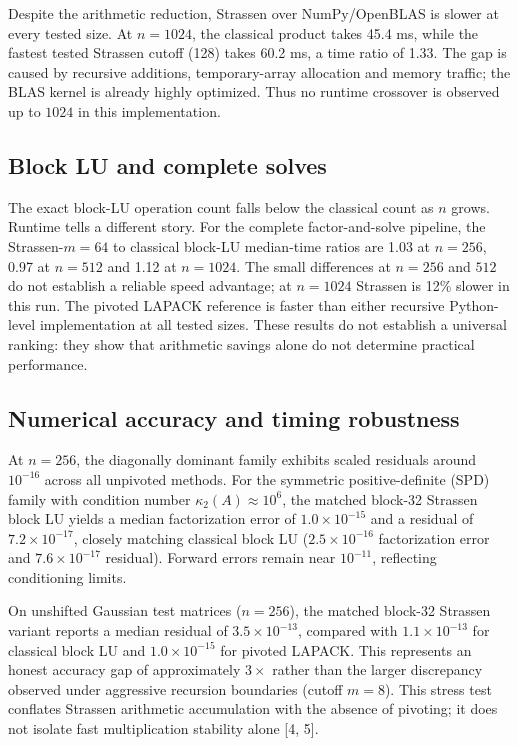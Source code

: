 \documentclass[9pt,a4paper]{article}
\begin{document}
Despite the arithmetic reduction, Strassen over NumPy/OpenBLAS is slower at every tested size. At $n=1024$, the classical product takes 45.4 ms, while the fastest tested Strassen cutoff (128) takes 60.2 ms, a time ratio of 1.33. The gap is caused by recursive additions, temporary-array allocation and memory traffic; the BLAS kernel is already highly optimized. Thus no runtime crossover is observed up to $1024$ in this implementation.

\subsection{Block LU and complete solves}
The exact block-LU operation count falls below the classical count as $n$ grows. Runtime tells a different story. For the complete factor-and-solve pipeline, the Strassen-$m=64$ to classical block-LU median-time ratios are 1.03 at $n=256$, 0.97 at $n=512$ and 1.12 at $n=1024$. The small differences at $n=256$ and $512$ do not establish a reliable speed advantage; at $n=1024$ Strassen is 12\% slower in this run. The pivoted LAPACK reference is faster than either recursive Python-level implementation at all tested sizes. These results do not establish a universal ranking: they show that arithmetic savings alone do not determine practical performance.

\newpage
\subsection{Numerical accuracy and timing robustness}
At $n=256$, the diagonally dominant family exhibits scaled residuals around $10^{-16}$ across all unpivoted methods. For the symmetric positive-definite (SPD) family with condition number $\kappa_2(A) \approx 10^{6}$, the matched block-32 Strassen block LU yields a median factorization error of $1.0 \times 10^{-15}$ and a residual of $7.2 \times 10^{-17}$, closely matching classical block LU ($2.5 \times 10^{-16}$ factorization error and $7.6 \times 10^{-17}$ residual). Forward errors remain near $10^{-11}$, reflecting conditioning limits. 

On unshifted Gaussian test matrices ($n=256$), the matched block-32 Strassen variant reports a median residual of $3.5 \times 10^{-13}$, compared with $1.1 \times 10^{-13}$ for classical block LU and $1.0 \times 10^{-15}$ for pivoted LAPACK. This represents an honest accuracy gap of approximately $3\times$ rather than the larger discrepancy observed under aggressive recursion boundaries (cutoff $m=8$). This stress test conflates Strassen arithmetic accumulation with the absence of pivoting; it does not isolate fast multiplication stability alone [4, 5]. 
\end{document}
